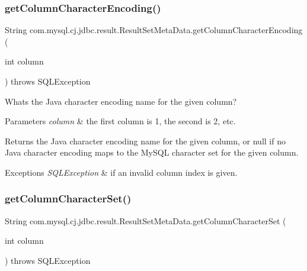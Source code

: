 \subsubsection{\texorpdfstring{get\+Column\+Character\+Encoding()}{getColumnCharacterEncoding()}}
{\footnotesize\ttfamily String com.\+mysql.\+cj.\+jdbc.\+result.\+Result\+Set\+Meta\+Data.\+get\+Column\+Character\+Encoding (\begin{DoxyParamCaption}\item[{int}]{column }\end{DoxyParamCaption}) throws S\+Q\+L\+Exception}

What\textquotesingle{}s the Java character encoding name for the given column?


\begin{DoxyParams}{Parameters}
{\em column} & the first column is 1, the second is 2, etc.\\
\hline
\end{DoxyParams}
\begin{DoxyReturn}{Returns}
the Java character encoding name for the given column, or null if no Java character encoding maps to the My\+S\+QL character set for the given column.
\end{DoxyReturn}

\begin{DoxyExceptions}{Exceptions}
{\em S\+Q\+L\+Exception} & if an invalid column index is given. \\
\hline
\end{DoxyExceptions}
\mbox{\label{classcom_1_1mysql_1_1cj_1_1jdbc_1_1result_1_1_result_set_meta_data_a35f38f97a73023c2496720366e165acb}} 
\subsubsection{\texorpdfstring{get\+Column\+Character\+Set()}{getColumnCharacterSet()}}
{\footnotesize\ttfamily String com.\+mysql.\+cj.\+jdbc.\+result.\+Result\+Set\+Meta\+Data.\+get\+Column\+Character\+Set (\begin{DoxyParamCaption}\item[{int}]{column }\end{DoxyParamCaption}) throws S\+Q\+L\+Exception}

